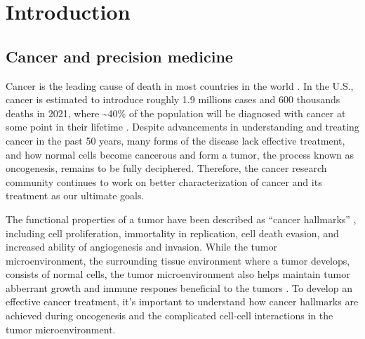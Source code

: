 \chapter{Introduction}
\label{chap:intro}
\tightlists











\section{Cancer and precision medicine}
Cancer is the leading cause of death in most countries in the world \cite{sungh_brayf:GlobalCancer2021}. In the U.S., cancer is estimated to introduce roughly 1.9 millions cases and 600 thousands deaths in 2021, where \textasciitilde40\% of the population will be diagnosed with cancer at some point in their lifetime \cite{siegelrl_jemala:CancerStatistics2021}. Despite advancements in understanding and treating cancer in the past 50 years, many forms of the disease lack effective treatment, and how normal cells become cancerous and form a tumor, the process known as oncogenesis, remains to be fully deciphered. Therefore, the cancer research community continues to work on better characterization of cancer and its treatment as our ultimate goals.

The functional properties of a tumor have been described as ``cancer hallmarks'' \cite{hanahand_weinbergra:HallmarksCancer2011}, including cell proliferation, immortality in replication, cell death evasion, and increased ability of angiogenesis and invasion. While the tumor microenvironment, the surrounding tissue environment where a tumor develops, consists of normal cells, the tumor microenvironment also helps maintain tumor abberrant growth and immune respones beneficial to the tumors \cite{hanahand_weinbergra:HallmarksCancer2011,quaildf_joyceja:MicroenvironmentalRegulation2013}. To develop an effective cancer treatment, it's important to understand how cancer hallmarks are achieved during oncogenesis and the complicated cell-cell interactions in the tumor microenvironment.


